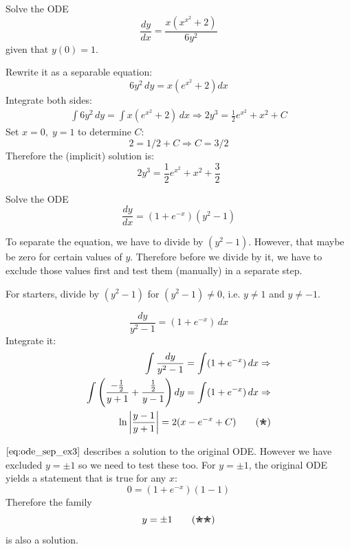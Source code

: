 \documentclass[a4paper]{article}
\begin{document}
\begin{exmp}[initial condition]
Solve the ODE
    \[
        \frac{dy}{dx} = \frac{x(x^{x^2} + 2)}{6y^2} 
    \]
given that $y(0) = 1$.
\end{exmp}
\begin{soln}
Rewrite it as a separable equation:
    \[
        6y^2\, dy = x(e^{x^2} + 2)dx
    \]
Integrate both sides:
\begin{align*}
        \int 6y^2\, dy = \int x(e^{x^2} + 2) \, dx \Rightarrow
        2y^3 = \frac{1}{2} e^{x^2} + x^2 + C
\end{align*}
Set $x=0, \; y=1$ to determine $C$:
    \[
        2= 1/2 + C \Rightarrow C = 3/2
    \]
Therefore the (implicit) solution is:
    \[
        2y^3 = \frac{1}{2} e^{x^2} + x^2 + \frac{3}{2} 
    \]
\end{soln}

\begin{exmp}
Solve the ODE
    \[
        \frac{dy}{dx} = (1 + e^{-x})(y^2 - 1)
    \]
\end{exmp}
\begin{soln}
To separate the equation, we have to divide by $(y^2-1)$. However, that maybe be zero for certain values of $y$. Therefore before we divide by it, we have to exclude those values first and test them (manually) in a separate step.

For starters, divide by $(y^2 - 1)$ for $(y^2 - 1) \neq 0$, i.e. $y \neq 1$ and $y \neq -1$.

    \[
        \frac{dy}{y^2 - 1} = (1 + e^{-x})  \, dx
    \]
Integrate it:
\begin{align*}
    \int \frac{dy}{y^2 - 1} = \int (1 + e^{-x})  \, dx \Rightarrow \\
    \int \Bigg(\frac{-\frac{1}{2}}{y+1} + \frac{\frac{1}{2}}{y-1}\Bigg)\, dy = \int (1 + e^{-x})  \, dx \Rightarrow \\
    \ln \left| \frac{y-1}{y+1} \right| = 2(x-e^{-x} + C) \tag{\ding{78}}
    \label{eq:ode_sep_ex3}
\end{align*}
\end{soln}
$\eqref{eq:ode_sep_ex3}$ describes a solution to the original ODE. However we have excluded $y = \pm 1$ so we need to test these too. For $y=\pm 1$, the original ODE yields a statement that is true for any $x$:
\[
    0 = (1 + e^{-x})(1 - 1)
\]
Therefore the family
\[
   y = \pm 1  \tag{\ding{78}\ding{78}}
\]
is also a solution.
\end{document}
